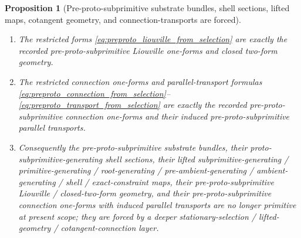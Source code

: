 \documentclass[11pt]{article}
\newtheorem{proposition}{Proposition}
\begin{document}
\begin{proposition}[Pre-proto-subprimitive substrate bundles, shell sections, lifted maps, cotangent geometry, and connection-transports are forced]
\begin{enumerate}
    \item The restricted forms \eqref{eq:preproto_liouville_from_selection} are exactly the recorded pre-proto-subprimitive Liouville one-forms and closed two-form geometry.
    \item The restricted connection one-forms and parallel-transport formulas \eqref{eq:preproto_connection_from_selection}--\eqref{eq:preproto_transport_from_selection} are exactly the recorded pre-proto-subprimitive connection one-forms and their induced pre-proto-subprimitive parallel transports.
    \item Consequently the pre-proto-subprimitive substrate bundles, their proto-subprimitive-generating shell sections, their lifted subprimitive-generating / primitive-generating / root-generating / pre-ambient-generating / ambient-generating / shell / exact-constraint maps, their pre-proto-subprimitive Liouville / closed-two-form geometry, and their pre-proto-subprimitive connection one-forms with induced parallel transports are no longer primitive at present scope; they are forced by a deeper stationary-selection / lifted-geometry / cotangent-connection layer.
\end{enumerate}
\end{proposition}
\end{document}
